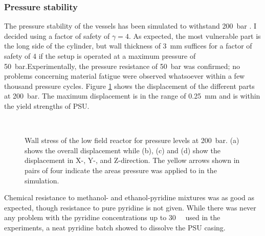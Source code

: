        \subsubsection{Pressure stability}
            The pressure stability of the vessels has been simulated to withstand \SI{200}{\bar} . I decided using a factor of safety of $\gamma = 4$. As expected, the most vulnerable part is the long side of the cylinder, but wall thickness of \SI{3}{\milli\meter} suffices for a factor of safety of 4 if the setup is operated at a maximum pressure of \SI{50}{\bar}.Experimentally, the pressure resistance of \SI{50}{\bar} was confirmed; no problems concerning material fatigue were observed whatsoever within a few thousand pressure cycles. Figure \ref{fig:results:bubblingReactorPressure} shows the displacement of the different parts at \SI{200}{\bar}. The maximum displacement is in the range of \SI{0.25}{\milli\meter} and is within the yield strengths of PSU.
            \begin{figure}
                \centering
                \hfill
                \\
                \hfill
                \caption[Reactor wall stress simulations]{Wall stress of the low field reactor for pressure levels at \SI{200}{\bar}. (a) shows the overall displacement while (b), (c) and (d) show the displacement in X-, Y-, and Z-direction.  The yellow arrows shown in pairs of four indicate the areas pressure was applied to in the simulation.}
                \label{fig:results:bubblingReactorPressure}
            \end{figure}
            Chemical resistance to methanol- and ethanol-pyridine mixtures was as good as expected, though resistance to pure pyridine is not given. While there was never any problem with the pyridine concentrations  up to \SI{30}{\micro\Molar} used in the experiments, a neat pyridine batch showed to dissolve the PSU casing.
